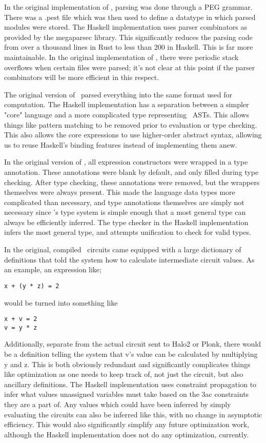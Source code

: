 \documentclass[
    9pt,            %
    techreport,        %
    affiltop,       %
]{art}
\begin{document}
In the original implementation of \VampIR{}, parsing was done through a PEG grammar. There was a .pest file which was then used to define a datatype in which parsed modules were stored. The Haskell implementation uses parser combinators as provided by the megaparsec library. This significantly reduces the parsing code from over a thousand lines in Rust to less than 200 in Haskell. This is far more maintainable. In the original implementation of \VampIR{}, there were periodic stack overflows when certain files were parsed; it's not clear at this point if the parser combinators will be more efficient in this respect.

The original version of \VampIR{}\ parsed everything into the same format used for computation. The Haskell implementation has a separation between a simpler "core" language and a more complicated type representing \VampIR{}\ ASTs. This allows things like pattern matching to be removed prior to evaluation or type checking. This also allows the core expressions to use higher-order abstract syntax, allowing us to reuse Haskell's binding features instead of implementing them anew.

In the original version of \VampIR{}, all expression constructors were wrapped in a type annotation. These annotations were blank by default, and only filled during type checking. After type checking, these annotations were removed, but the wrappers themselves were always present. This made the language data types more complicated than necessary, and type annotations themselves are simply not necessary since \VampIR{}'s type system is simple enough that a most general type can always be efficiently inferred. The type checker in the Haskell implementation infers the most general type, and attempts unification to check for valid types.

In the original, compiled \VampIR{}\ circuits came equipped with a large dictionary of definitions that told the system how to calculate intermediate circuit values. As an example, an expression like;

\begin{verbatim}
x + (y * z) = 2
\end{verbatim}
would be turned into something like
\begin{verbatim}
x + v = 2
v = y * z
\end{verbatim}
Additionally, separate from the actual circuit sent to Halo2 or Plonk, there would be a definition telling the system that v's value can be calculated by multiplying y and z. This is both obviously redundant and significantly complicates things like optimization as one needs to keep track of, not just the circuit, but also ancillary definitions. The Haskell implementation uses constraint propagation to infer what values unassigned variables must take based on the 3ac constraints they are a part of. Any values which could have been inferred by simply evaluating the circuits can also be inferred like this, with no change in asymptotic efficiency. This would also significantly simplify any future optimization work, although the Haskell implementation does not do any optimization, currently.


\nocite{*}

\end{document}

